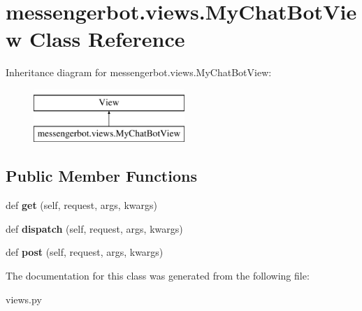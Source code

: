 \hypertarget{classmessengerbot_1_1views_1_1MyChatBotView}{}\section{messengerbot.\+views.\+My\+Chat\+Bot\+View Class Reference}
\label{classmessengerbot_1_1views_1_1MyChatBotView}
Inheritance diagram for messengerbot.\+views.\+My\+Chat\+Bot\+View\+:\begin{figure}[H]
\begin{center}
\leavevmode
\includegraphics[height=2.000000cm]{classmessengerbot_1_1views_1_1MyChatBotView}
\end{center}
\end{figure}
\subsection*{Public Member Functions}
\begin{DoxyCompactItemize}
\item 
\mbox{\label{classmessengerbot_1_1views_1_1MyChatBotView_a3023bcfc14b0a4a963d47ec01af604ad}} 
def {\bfseries get} (self, request, args, kwargs)
\item 
\mbox{\label{classmessengerbot_1_1views_1_1MyChatBotView_a046fb0cd8f4598904864633b1b76a0b8}} 
def {\bfseries dispatch} (self, request, args, kwargs)
\item 
\mbox{\label{classmessengerbot_1_1views_1_1MyChatBotView_a60402a8e54abc2020a4ca63b84506b9a}} 
def {\bfseries post} (self, request, args, kwargs)
\end{DoxyCompactItemize}


The documentation for this class was generated from the following file\+:\begin{DoxyCompactItemize}
\item 
views.\+py\end{DoxyCompactItemize}
